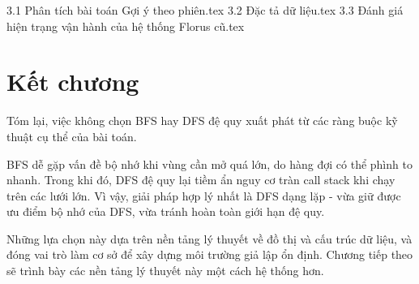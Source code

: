 
{3.1 Phân tích bài toán Gợi ý theo phiên.tex}
{3.2 Đặc tả dữ liệu.tex}
{3.3 Đánh giá hiện trạng vận hành của hệ thống Florus cũ.tex}

\section{Kết chương}

Tóm lại, việc không chọn BFS hay DFS đệ quy xuất phát từ các ràng buộc kỹ thuật cụ thể của bài toán.

BFS dễ gặp vấn đề bộ nhớ khi vùng cần mở quá lớn, do hàng đợi có thể phình to nhanh. Trong khi đó, DFS đệ quy lại tiềm ẩn nguy cơ tràn call stack khi chạy trên các lưới lớn. Vì vậy, giải pháp hợp lý nhất là DFS dạng lặp - vừa giữ được ưu điểm bộ nhớ của DFS, vừa tránh hoàn toàn giới hạn đệ quy.

Những lựa chọn này dựa trên nền tảng lý thuyết về đồ thị và cấu trúc dữ liệu, và đóng vai trò làm cơ sở để xây dựng môi trường giả lập ổn định. Chương tiếp theo sẽ trình bày các nền tảng lý thuyết này một cách hệ thống hơn.